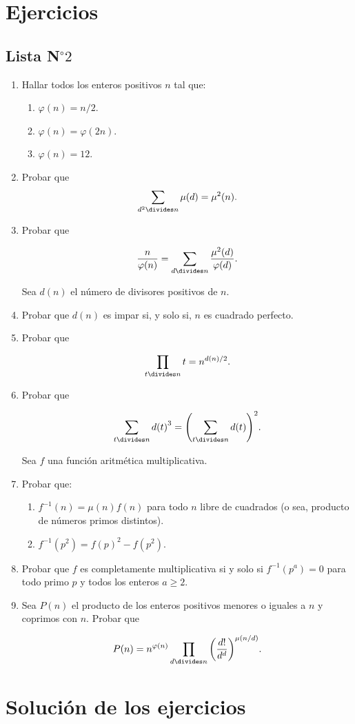 \section{Ejercicios}
\subsection{Lista N$^{\circ}2$}
\begin{enumerate}[font={\bfseries},label={\arabic*.}]
\item Hallar todos los enteros positivos $n$ tal que:
\begin{multicols}{3}
\begin{enumerate}
	\item $\varphi(n)=n/2$.
	\item $\varphi(n)=\varphi(2n)$.
	\item $\varphi(n)=12$.
\end{enumerate}	
\end{multicols}

\item Probar que
\[\sum_{d^{2}\divides n}\mu(d)=\mu^{2}(n).\]
\item Probar que

\[\frac{n}{\varphi(n)}=\sum_{d\divides n}\frac{\mu^{2}(d)}{\varphi(d)}.\]

\noindent
Sea $d(n)$ el número de divisores positivos de $n$.

\item Probar que $d(n)$ es impar si, y solo si, $n$ es cuadrado perfecto.

\item Probar que

\[\prod_{t\divides n}t=n^{d(n)/2}.\]

\item Probar que

\[\sum_{t\divides n}{d(t)}^{3}={\left(\sum_{t\divides n}d(t)\right)}^{2}.\]

Sea $f$ una función aritmética multiplicativa.

\item Probar que:

\begin{enumerate}
	\item $f^{-1}(n)=\mu(n)f(n)$ para todo $n$ libre de cuadrados (o sea, producto de números primos distintos).
	\item $f^{-1}(p^{2})={f(p)}^{2}-f(p^{2})$.
\end{enumerate}

\item Probar que $f$ es completamente multiplicativa si y solo si $f^{-1}(p^{a})=0$ para todo primo $p$ y todos los enteros $a\geq2$.

\item Sea $P(n)$ el producto de los enteros positivos menores o iguales a $n$ y coprimos con $n$. Probar que

\[P(n)=n^{\varphi(n)}\prod_{d\divides n}{\left(\frac{d!}{d^{d}}\right)}^{\mu\left(n/d\right)}.\]
\end{enumerate}

\section{Solución de los ejercicios}

